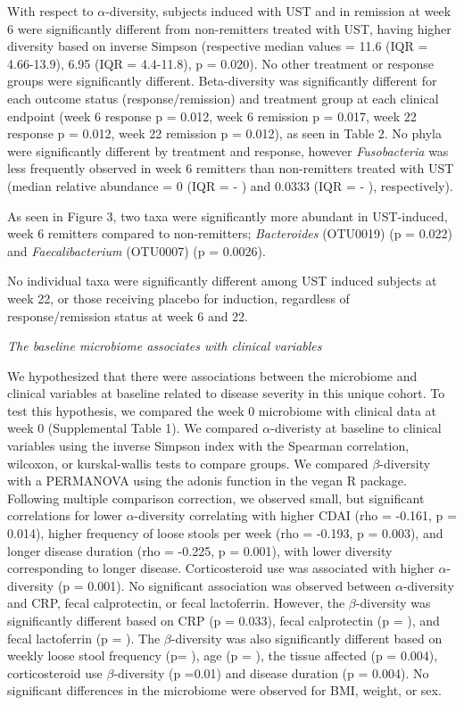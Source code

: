 \documentclass[11pt,]{article}
\begin{document}
With respect to \({\alpha}\)-diversity, subjects induced with UST and in
remission at week 6 were significantly different from non-remitters
treated with UST, having higher diversity based on inverse Simpson
(respective median values = 11.6 (IQR = 4.66-13.9), 6.95 (IQR =
4.4-11.8), p = 0.020). No other treatment or response groups were
significantly different. Beta-diversity was significantly different for
each outcome status (response/remission) and treatment group at each
clinical endpoint (week 6 response p = 0.012, week 6 remission p =
0.017, week 22 response p = 0.012, week 22 remission p = 0.012), as seen
in Table 2. No phyla were significantly different by treatment and
response, however \emph{Fusobacteria} was less frequently observed in
week 6 remitters than non-remitters treated with UST (median relative
abundance = 0 (IQR = - ) and 0.0333 (IQR = - ), respectively).

As seen in Figure 3, two taxa were significantly more abundant in
UST-induced, week 6 remitters compared to non-remitters;
\emph{Bacteroides} (OTU0019) (p = 0.022) and \emph{Faecalibacterium}
(OTU0007) (p = 0.0026).

No individual taxa were significantly different among UST induced
subjects at week 22, or those receiving placebo for induction,
regardless of response/remission status at week 6 and 22.

\emph{The baseline microbiome associates with clinical variables}

We hypothesized that there were associations between the microbiome and
clinical variables at baseline related to disease severity in this
unique cohort. To test this hypothesis, we compared the week 0
microbiome with clinical data at week 0 (Supplemental Table 1). We
compared \({\alpha}\)-diveristy at baseline to clinical variables using
the inverse Simpson index with the Spearman correlation, wilcoxon, or
kurskal-wallis tests to compare groups. We compared
\({\beta}\)-diversity with a PERMANOVA using the adonis function in the
vegan R package. Following multiple comparison correction, we observed
small, but significant correlations for lower \({\alpha}\)-diversity
correlating with higher CDAI (rho = -0.161, p = 0.014), higher frequency
of loose stools per week (rho = -0.193, p = 0.003), and longer disease
duration (rho = -0.225, p = 0.001), with lower diversity corresponding
to longer disease. Corticosteroid use was associated with higher
\({\alpha}\)-diversity (p = 0.001). No significant association was
observed between \({\alpha}\)-diversity and CRP, fecal calprotectin, or
fecal lactoferrin. However, the \({\beta}\)-diversity was significantly
different based on CRP (p = 0.033), fecal calprotectin (p = ), and fecal
lactoferrin (p = ). The \({\beta}\)-diversity was also significantly
different based on weekly loose stool frequency (p= ), age (p = ), the
tissue affected (p = 0.004), corticosteroid use \({\beta}\)-diversity (p
=0.01) and disease duration (p = 0.004). No significant differences in
the microbiome were observed for BMI, weight, or sex.
\end{document}
